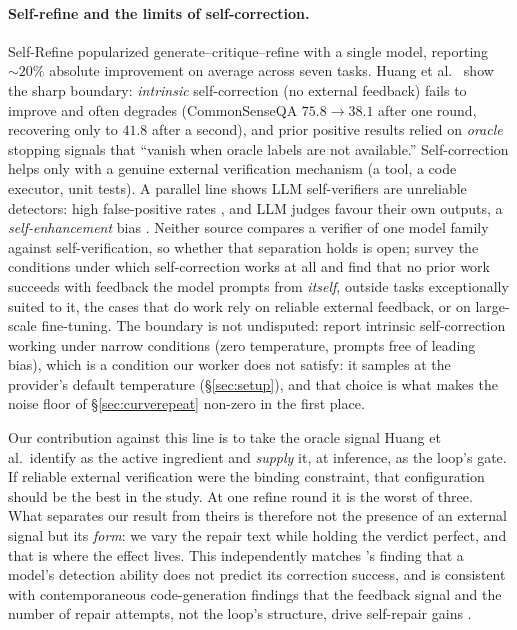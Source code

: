 \documentclass[11pt]{article}
\begin{document}
\paragraph{Self-refine and the limits of self-correction.}
Self-Refine \citep{madaan2023selfrefine} popularized generate--critique--refine
with a single model, reporting ${\sim}20\%$ absolute improvement on average across seven tasks.
Huang et al.\ \citep{huang2023cannot} show the sharp boundary: \emph{intrinsic}
self-correction (no external feedback) fails to improve and often degrades
(CommonSenseQA $75.8 \!\to\! 38.1$ after one round, recovering only to $41.8$ after a
second), and prior positive results
relied on \emph{oracle} stopping signals that ``vanish when oracle labels are
not available.'' Self-correction helps only with a genuine external verification
mechanism (a tool, a code executor, unit tests). A parallel line shows LLM
self-verifiers are unreliable detectors: high false-positive rates
\citep{valmeekam2023selfcritique}, and LLM judges favour their own outputs, a
\emph{self-enhancement} bias \citep{zheng2023judging}. Neither source compares a verifier of one
model family against self-verification, so whether that separation holds is
open; \citet{kamoi2024whencan} survey the conditions
under which self-correction works at all and find that no prior work succeeds with feedback the
model prompts from \emph{itself}, outside tasks exceptionally suited to it, the cases that do
work rely on reliable external feedback, or on large-scale fine-tuning. The boundary is not
undisputed:
\citet{liu2024intrinsic} report intrinsic self-correction working under narrow conditions
(zero temperature, prompts free of leading bias), which is a condition our worker does not
satisfy: it samples at the provider's default temperature (\S\ref{sec:setup}), and that
choice is what makes the noise floor of \S\ref{sec:curverepeat} non-zero in the first place.

Our contribution against this line is to take the oracle signal Huang et al.\ identify as the
active ingredient and \emph{supply} it, at inference, as the loop's gate. If reliable external
verification were the binding constraint, that configuration should be the best in the study. At
one refine round it is the worst of three. What separates our result from theirs is therefore not the presence of an
external signal but its \emph{form}: we vary the repair text while holding the verdict perfect, and
that is where the effect lives. This independently matches
\citet{decomposing2026selfcorrection}'s finding that a model's detection ability does not
predict its correction success, and is consistent with contemporaneous
code-generation findings that the feedback signal and the number of repair attempts, not
the loop's structure, drive self-repair gains \citep{feedbackoverform2026,howmanytries2026}.
\end{document}
